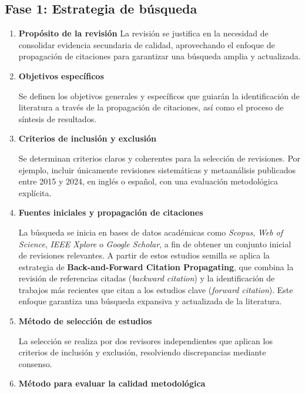 \subsection*{Fase 1: Estrategia de búsqueda}

\begin{enumerate}
    \item \textbf{Propósito de la revisión}  
    La revisión se justifica en la necesidad de consolidar evidencia secundaria de calidad, aprovechando el enfoque de propagación de citaciones para garantizar una búsqueda amplia y actualizada.
    
    \item \textbf{Objetivos específicos}  

    Se definen los objetivos generales y específicos que guiarán la identificación de literatura a través de la propagación de citaciones, así como el proceso de síntesis de resultados.

    \item \textbf{Criterios de inclusión y exclusión}  

    Se determinan criterios claros y coherentes para la selección de revisiones. Por ejemplo, incluir únicamente revisiones sistemáticas y metaanálisis publicados entre 2015 y 2024, en inglés o español, con una evaluación metodológica explícita.

    \item \textbf{Fuentes iniciales y propagación de citaciones}  
    
    La búsqueda se inicia en bases de datos académicas como \textit{Scopus}, \textit{Web of Science}, 
    \textit{IEEE Xplore} o \textit{Google Scholar}, a fin de obtener un conjunto inicial de revisiones relevantes. 
    A partir de estos estudios semilla se aplica la estrategia de \textbf{Back-and-Forward Citation Propagating}, 
    que combina la revisión de referencias citadas (\textit{backward citation}) y la identificación de trabajos 
    más recientes que citan a los estudios clave (\textit{forward citation}). Este enfoque garantiza una búsqueda 
    expansiva y actualizada de la literatura.

    \item \textbf{Método de selección de estudios}  

    La selección se realiza por dos revisores independientes que aplican los criterios de inclusión y exclusión, resolviendo discrepancias mediante consenso.

    \item \textbf{Método para evaluar la calidad metodológica}  


\end{enumerate}
